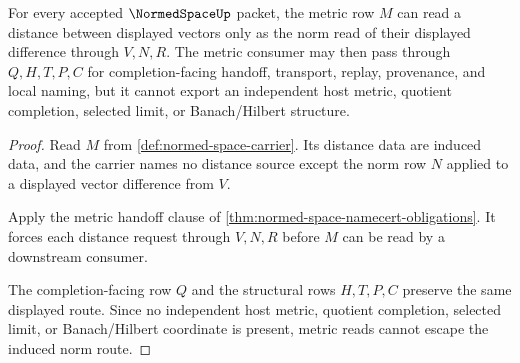 \begin{theorem}
\label{thm:normed-space-metric-nonescape}
For every accepted $\NormedSpaceUp$ packet, the metric row $M$ can read a distance between displayed vectors only as the norm read of their displayed difference through $V,N,R$. The metric consumer may then pass through $Q,H,T,P,C$ for completion-facing handoff, transport, replay, provenance, and local naming, but it cannot export an independent host metric, quotient completion, selected limit, or Banach/Hilbert structure.
\end{theorem}
\begin{proof}
Read $M$ from \autoref{def:normed-space-carrier}. Its distance data are induced data, and the carrier names no distance source except the norm row $N$ applied to a displayed vector difference from $V$.

Apply the metric handoff clause of \autoref{thm:normed-space-namecert-obligations}. It forces each distance request through $V,N,R$ before $M$ can be read by a downstream consumer.

The completion-facing row $Q$ and the structural rows $H,T,P,C$ preserve the same displayed route. Since no independent host metric, quotient completion, selected limit, or Banach/Hilbert coordinate is present, metric reads cannot escape the induced norm route.
\end{proof}

